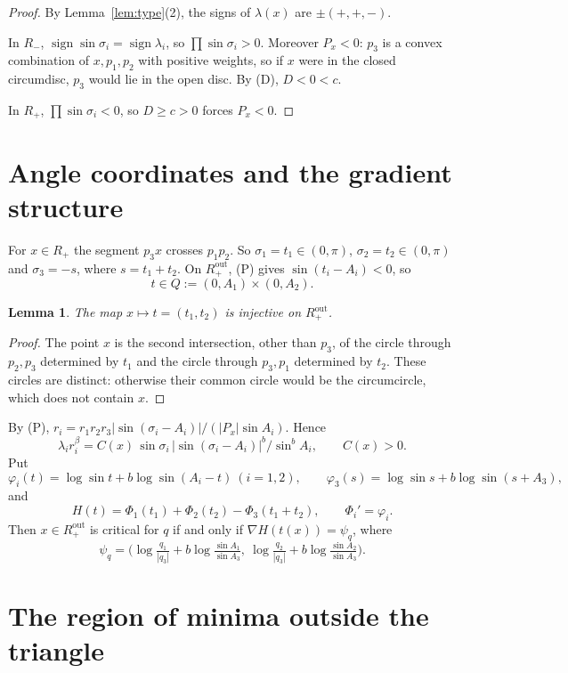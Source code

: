 \documentclass[11pt]{amsart}
\newtheorem{lemma}[theorem]{Lemma}
\theoremstyle{remark}
\begin{document}
\begin{proof}
By Lemma~\ref{lem:type}(2), the signs of $\lambda(x)$ are $\pm(+,+,-)$.

In $R_-$, $\operatorname{sign}\sin\sigma_i=\operatorname{sign}\lambda_i$, so $\prod\sin\sigma_i>0$. Moreover $P_x<0$:
$p_3$ is a convex combination of $x,p_1,p_2$ with positive weights, so if $x$ were in the closed circumdisc, $p_3$
would lie in the open disc. By (D), $D<0<c$.

In $R_+$, $\prod\sin\sigma_i<0$, so $D\ge c>0$ forces $P_x<0$.
\end{proof}

\section{Angle coordinates and the gradient structure}\label{sec:grad}

For $x\in R_+$ the segment $p_3x$ crosses $p_1p_2$. So $\sigma_1=t_1\in(0,\pi)$, $\sigma_2=t_2\in(0,\pi)$ and
$\sigma_3=-s$, where $s=t_1+t_2$. On $R_+^{\mathrm{out}}$, (P) gives $\sin(t_i-A_i)<0$, so
\[
  t\in Q:=(0,A_1)\times(0,A_2).
\]

\begin{lemma}\label{lem:inj2}
The map $x\mapsto t=(t_1,t_2)$ is injective on $R_+^{\mathrm{out}}$.
\end{lemma}

\begin{proof}
The point $x$ is the second intersection, other than $p_3$, of the circle through $p_2,p_3$ determined by $t_1$ and the
circle through $p_3,p_1$ determined by $t_2$. These circles are distinct: otherwise their common circle would be the
circumcircle, which does not contain $x$.
\end{proof}

By (P), $r_i=r_1r_2r_3|\sin(\sigma_i-A_i)|/(|P_x|\sin A_i)$. Hence
\[
  \lambda_ir_i^\beta=C(x)\,\sin\sigma_i\,|\sin(\sigma_i-A_i)|^b/\sin^bA_i,\qquad C(x)>0 .
\]
Put
\[
  \varphi_i(t)=\log\sin t+b\log\sin(A_i-t)\ (i=1,2),\qquad \varphi_3(s)=\log\sin s+b\log\sin(s+A_3),
\]
and
\[
  H(t)=\Phi_1(t_1)+\Phi_2(t_2)-\Phi_3(t_1+t_2),\qquad \Phi_i'=\varphi_i .
\]
Then $x\in R_+^{\mathrm{out}}$ is critical for $q$ if and only if $\nabla H(t(x))=\psi_q$, where
\[
  \psi_q=\bigl(\log\tfrac{q_1}{|q_3|}+b\log\tfrac{\sin A_1}{\sin A_3},\ \log\tfrac{q_2}{|q_3|}+b\log\tfrac{\sin A_2}{\sin A_3}\bigr).
\]

\section{The region of minima outside the triangle}
\end{document}
